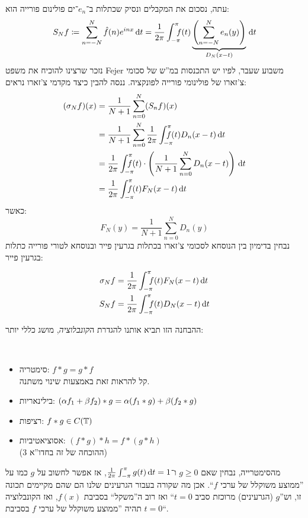 \documentclass[name=רשימות חדו''א 2א]{../../../tex/classes/noChapterMegasumPreamble}
\begin{document}
	עתה, נסכום את המקבלים ונסיק שכתלות ב־$e_n$־ים פולינום פורייה הוא:
	\[ S_Nf \cod \sum_{n = -N}^{N} \hat f(n)e^{inx}\dt = \frac{1}{2\pi}\int^{\pi}_{-\pi}\dequad \ f(t)\underbrace{\cl{\sum_{n = -N}^{N}e_n(y)}}_{D_N(x - t)}\dt \]
	נזכר שרצינו להוכיח את משפט Fejer משבוע שעבר, לפיו יש התכנסות במ''ש של סכומי צ'זארו של פולינומי פורייה לפונקציה. ננסה להבין כיצד מקדמי צ'זארו נראים:
	\begin{align*}
		(\sg_N f)(x) &= \frac{1}{N + 1}\sum^{N}_{n = 0}(S_nf)(x) \\
		&= \frac{1}{N + 1}\sum_{n = 0}^{N}\frac{1}{2\pi}\int^{\pi}_{-\pi}\dequad f(t)D_n(x - t)\dt \\
		&= \frac{1}{2\pi}\int^{\pi}_{-\pi}\dequad f(t) \cdot \cl{\frac{1}{N + 1}\sum_{n = 0}^{N}D_n(x - t)}\dt \\
		&= \frac{1}{2\pi}\int^{\pi}_{-\pi}\dequad f(t)F_N(x - t)\dt
	\end{align*}
	כאשר:
	\[ F_N(y) = \frac{1}{N + 1}\sum_{n = 0}^{N}D_n(y) \]
	נבחין בדימיון בין הנוסחא לסכומי צ'זארו בכתלות בגרעין פייר ובנוסחא לטורי פורייה כתלות בגרעין פייר:
	\begin{Claim}\label{clm:1}
		\begin{align*}
			\sg_N f &= \frac{1}{2\pi}\int^{\pi}_{-\pi}\dequad \ f(t)F_N(x - t)\dt \\
			S_Nf &= \frac{1}{2\pi}\int^{\pi}_{-\pi}\dequad \ f(t){D_N(x - t)}\dt
		\end{align*}
	\end{Claim}
	ההבחנה הזו תביא אותנו להגדרת ה\textit{קונבלוציה}, מושג כללי יותר:
	\begin{Claim}[תכונות הקונבלוציה]\
		\begin{itemize}
			\item סימטריה: \hfil $f * g = g * f$ \\
			קל להראות זאת באמצעות שינוי משתנה.
			\item בילינאריות: \hfil $\left ( \alpha f_1 + \beta f_2 \right ) * g = \alpha (f_1 * g) + \beta (f_2 * g)$
			\item רציפות: \hfil $f * g \in C(\mathbb{T})$
			\item אסוציאטיביות: \hfil $(f * g) * h = f * (g * h)$\\
			(ההוכחה של זה בחדו''א 3)
		\end{itemize}
	\end{Claim}
	מהסימטרייה, נבחין שאם $g \ge 0$ ו־$\frac{1}{2\pi}\int^{\pi}_{-\pi} g(t)\,\mathrm{d}t = 1$, אז אפשר לחשוב על $g$ כמו על ''ממוצע משוקלל של ערכי $f$``. אכן מה שקורה בעבור הגרעינים שלנו הם שהם מקיימים תכונה זו, וש''$g$ (הגרעינים) מרוכזת סביב $t = 0$`` ואז רוב ה''משקל`` בסביבת $f(x)$, ואז הקונבלוציה תהיה ''ממוצע משוקלל של ערכי $f$ בסביבת $t = 0$``.
\end{document}
